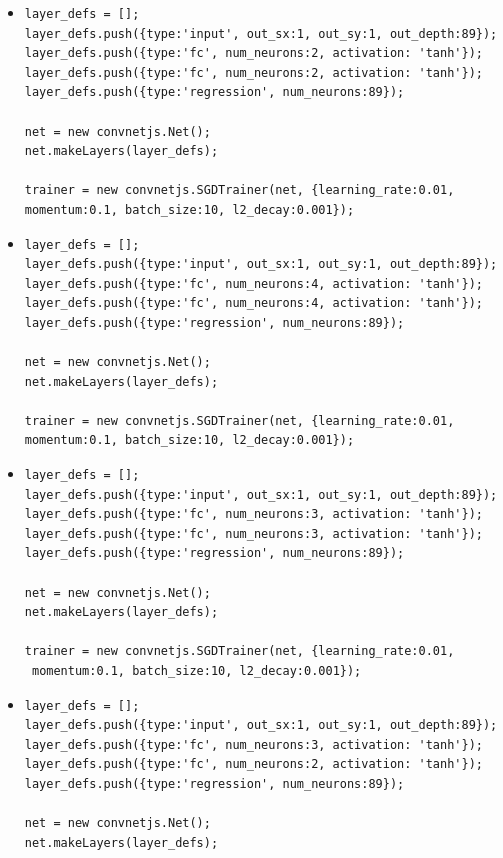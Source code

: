 \begin{itemize}
\item \begin{verbatim}
layer_defs = [];
layer_defs.push({type:'input', out_sx:1, out_sy:1, out_depth:89});
layer_defs.push({type:'fc', num_neurons:2, activation: 'tanh'});
layer_defs.push({type:'fc', num_neurons:2, activation: 'tanh'});
layer_defs.push({type:'regression', num_neurons:89});

net = new convnetjs.Net();
net.makeLayers(layer_defs);

trainer = new convnetjs.SGDTrainer(net, {learning_rate:0.01, 
momentum:0.1, batch_size:10, l2_decay:0.001});
\end{verbatim}

\item \begin{verbatim}
layer_defs = [];
layer_defs.push({type:'input', out_sx:1, out_sy:1, out_depth:89});
layer_defs.push({type:'fc', num_neurons:4, activation: 'tanh'});
layer_defs.push({type:'fc', num_neurons:4, activation: 'tanh'});
layer_defs.push({type:'regression', num_neurons:89});

net = new convnetjs.Net();
net.makeLayers(layer_defs);

trainer = new convnetjs.SGDTrainer(net, {learning_rate:0.01, 
momentum:0.1, batch_size:10, l2_decay:0.001});
\end{verbatim}


\item \begin{verbatim}
layer_defs = [];
layer_defs.push({type:'input', out_sx:1, out_sy:1, out_depth:89});
layer_defs.push({type:'fc', num_neurons:3, activation: 'tanh'});
layer_defs.push({type:'fc', num_neurons:3, activation: 'tanh'});
layer_defs.push({type:'regression', num_neurons:89});

net = new convnetjs.Net();
net.makeLayers(layer_defs);

trainer = new convnetjs.SGDTrainer(net, {learning_rate:0.01,
 momentum:0.1, batch_size:10, l2_decay:0.001});
\end{verbatim}


\item \begin{verbatim}
layer_defs = [];
layer_defs.push({type:'input', out_sx:1, out_sy:1, out_depth:89});
layer_defs.push({type:'fc', num_neurons:3, activation: 'tanh'});
layer_defs.push({type:'fc', num_neurons:2, activation: 'tanh'});
layer_defs.push({type:'regression', num_neurons:89});

net = new convnetjs.Net();
net.makeLayers(layer_defs);


\end{verbatim}
\end{itemize}
